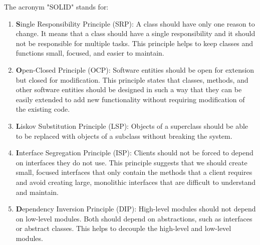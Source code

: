 The acronym "SOLID" stands for:
\begin{enumerate}
    \item \textbf{S}ingle Responsibility Principle (SRP): A class should have only one reason to change. It means that a class should have a single responsibility and it should not be responsible for multiple tasks. This principle helps to keep classes and functions small, focused, and easier to maintain.
    \item \textbf{O}pen-Closed Principle (OCP): Software entities should be open for extension but closed for modification. This principle states that classes, methods, and other software entities should be designed in such a way that they can be easily extended to add new functionality without requiring modification of the existing code.
    \item \textbf{L}iskov Substitution Principle (LSP): Objects of a superclass should be able to be replaced with objects of a subclass without breaking the system.
    \item \textbf{I}nterface Segregation Principle (ISP): Clients should not be forced to depend on interfaces they do not use. This principle suggests that we should create small, focused interfaces that only contain the methods that a client requires and avoid creating large, monolithic interfaces that are difficult to understand and maintain.
    \item \textbf{D}ependency Inversion Principle (DIP): High-level modules should not depend on low-level modules. Both should depend on abstractions, such as interfaces or abstract classes. This helps to decouple the high-level and low-level modules.
\end{enumerate}

\clearpage
